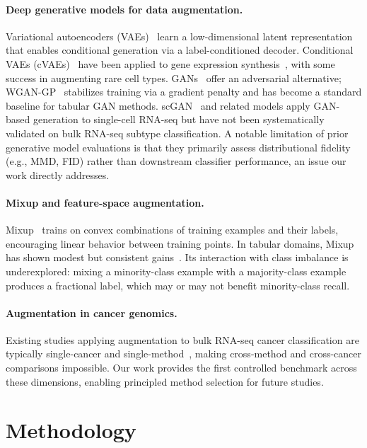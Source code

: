 \documentclass{article}
\begin{document}
\paragraph{Deep generative models for data augmentation.}
Variational autoencoders (VAEs)~\cite{Kingma2014} learn a low-dimensional latent representation
that enables conditional generation via a label-conditioned decoder. Conditional VAEs
(cVAEs)~\cite{Sohn2015} have been applied to gene expression synthesis~\cite{Marouf2020,Way2018},
with some success in augmenting rare cell types. GANs~\cite{Goodfellow2014} offer an adversarial
alternative; WGAN-GP~\cite{Gulrajani2017} stabilizes training via a gradient penalty and has
become a standard baseline for tabular GAN methods. scGAN~\cite{Marouf2020} and related models
apply GAN-based generation to single-cell RNA-seq but have not been systematically validated on
bulk RNA-seq subtype classification. A notable limitation of prior generative model evaluations
is that they primarily assess distributional fidelity (e.g., MMD, FID) rather than downstream
classifier performance, an issue our work directly addresses.

\paragraph{Mixup and feature-space augmentation.}
Mixup~\cite{Zhang2018} trains on convex combinations of training examples and their labels,
encouraging linear behavior between training points. In tabular domains, Mixup has shown modest
but consistent gains~\cite{Guo2019}. Its interaction with class imbalance is underexplored:
mixing a minority-class example with a majority-class example produces a fractional label, which
may or may not benefit minority-class recall.

\paragraph{Augmentation in cancer genomics.}
Existing studies applying augmentation to bulk RNA-seq cancer classification are typically
single-cancer and single-method~\cite{Yoon2020,Levy2020}, making cross-method and cross-cancer
comparisons impossible. Our work provides the first controlled benchmark across these dimensions,
enabling principled method selection for future studies.

\section{Methodology}
\end{document}
